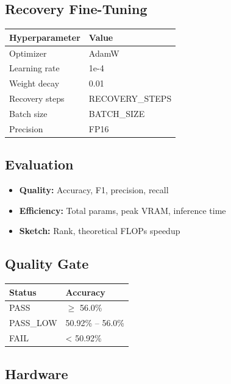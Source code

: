 \subsection{Recovery Fine-Tuning}

\begin{table}[H]
\centering
\small
\begin{tabular}{ll}
\toprule
\textbf{Hyperparameter} & \textbf{Value} \\
\midrule
Optimizer & AdamW \\
Learning rate & 1e-4 \\
Weight decay & 0.01 \\
Recovery steps & {{RECOVERY\_STEPS}} \\
Batch size & {{BATCH\_SIZE}} \\
Precision & FP16 \\
\bottomrule
\end{tabular}
\end{table}

\subsection{Evaluation}

\begin{itemize}
\item \textbf{Quality:} Accuracy, F1, precision, recall
\item \textbf{Efficiency:} Total params, peak VRAM, inference time
\item \textbf{Sketch:} Rank, theoretical FLOPs speedup

\end{itemize}
\subsection{Quality Gate}

\begin{table}[H]
\centering
\small
\begin{tabular}{ll}
\toprule
\textbf{Status} & \textbf{Accuracy} \\
\midrule
PASS & $\ge$ 56.0\% \\
PASS\_LOW & 50.92\% -- 56.0\% \\
FAIL & < 50.92\% \\
\bottomrule
\end{tabular}
\end{table}

\subsection{Hardware}

